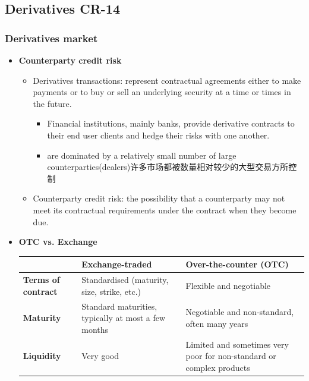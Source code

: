 

\subsection{Derivatives CR-14}

\subsubsection{Derivatives market}
\begin{itemize}
\item \textbf{Counterparty credit risk}
\begin{itemize}
    \item Derivatives transactions: represent contractual agreements either to make payments or to buy or sell an underlying security at a time or times in the future.
    \begin{itemize}
        \item Financial institutions, mainly banks, provide derivative contracts to their end user clients and hedge their risks with one another.
        \item are dominated by a relatively small number of large counterparties(dealers)许多市场都被数量相对较少的大型交易方所控制
    \end{itemize}
   \item Counterparty credit risk: the possibility that a counterparty may not meet its contractual requirements under the contract when they become due.
\end{itemize}


\item \textbf{OTC vs. Exchange}\\
\begin{tabular}{|p{5cm}|p{5cm}|p{5cm}|}
    \hline
    &\textbf{Exchange-traded} & \textbf{Over-the-counter (OTC)} \\
    \hline
    \textbf{Terms of contract} & Standardised (maturity, size, strike, etc.) & Flexible and negotiable \\
    \hline
    \textbf{Maturity} & Standard maturities, typically at most a few months & Negotiable and non-standard, often many years \\
    \hline
    \textbf{Liquidity} & Very good & Limited and sometimes very poor for non-standard or complex products \\
    \hline
\end{tabular}




\end{itemize}
